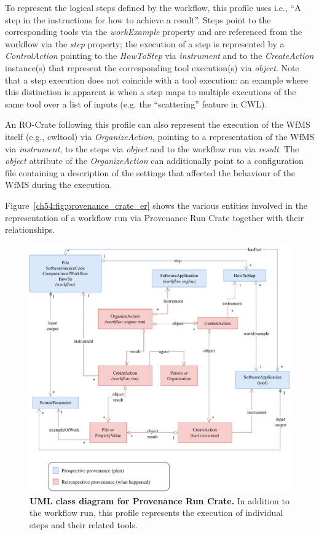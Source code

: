 To represent the logical steps defined by the workflow, this profile uses  i.e., “A step in the instructions for how to achieve a result”.
Steps point to the corresponding tools via the \emph{workExample} property and are referenced from the workflow via the \emph{step} property; the execution of a step is represented by a \emph{ControlAction} pointing to the
\emph{HowToStep} via \emph{instrument} and to the \emph{CreateAction}
instance(s) that represent the corresponding tool execution(s) via
\emph{object}.
Note that a step execution does not coincide with a tool execution: an example where this distinction is apparent is when a step maps to multiple executions of the same tool over a list of inputs (e.g. the ``scattering'' feature in CWL).

An RO-Crate following this profile can also represent the execution of the WfMS itself (e.g., cwltool) via
\emph{OrganizeAction}, pointing to a representation of the WfMS via
\emph{instrument}, to the steps via \emph{object} and to the workflow run via \emph{result}.
The \emph{object} attribute of the
\emph{OrganizeAction} can additionally point to a configuration file containing a description of the settings that affected the behaviour of the WfMS during the execution.

Figure~\vref{ch54:fig:provenance_crate_er} shows the various entities involved in the representation of a workflow run via Provenance Run Crate together with their relationships.

\begin{figure}[htp]
\includegraphics[width=\textwidth]{figures/ch54/wrroc-figure3.drawio.pdf}
\caption[UML class diagram for Provenance Run Crate]{{\bf UML class diagram for Provenance Run Crate.}
In addition to the workflow run, this profile represents the execution of individual steps and their related tools.}
\label{ch54:fig:provenance_crate_er}
\end{figure}

